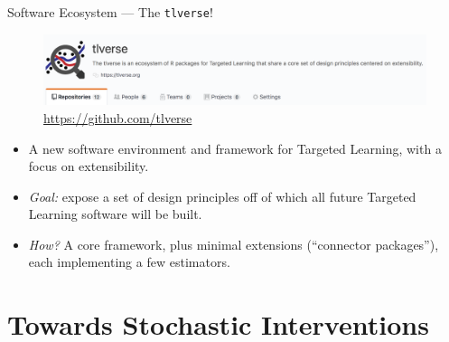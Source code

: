 \documentclass{beamer}
\begin{document}

\begin{frame}[c]{Software Ecosystem --- The \texttt{tlverse}!}

\begin{figure}[H]
  \centering
  \includegraphics[width=\textwidth]{tlverse}
  \caption{
    \url{https://github.com/tlverse}
  }
\end{figure}

\vspace{-1em}

\begin{center}
\begin{itemize}
  \itemsep4pt
  \item A new software environment and framework for Targeted Learning, with a
    focus on extensibility.
  \item \textit{Goal:} expose a set of design principles off of which all future
    Targeted Learning software will be built.
  \item \textit{How?} A core framework, plus minimal extensions (``connector
    packages''), each implementing a few estimators.
\end{itemize}
\end{center}


\end{frame}


\section{Towards Stochastic Interventions}

\end{document}
